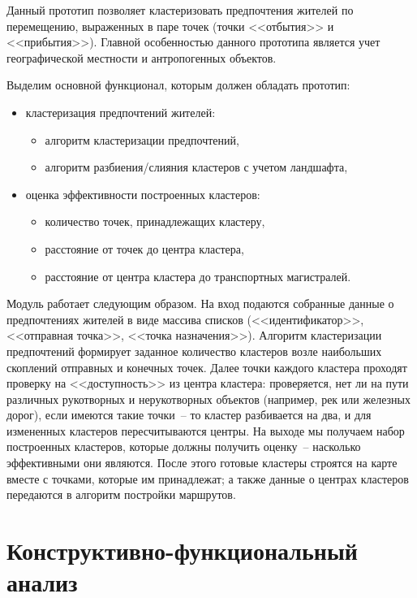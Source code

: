 Данный прототип позволяет кластеризовать предпочтения жителей по перемещению,
выраженных в паре точек (точки <<отбытия>> и <<прибытия>>). Главной
особенностью данного прототипа является учет географической местности и
антропогенных объектов.

Выделим основной функционал, которым должен обладать прототип:
\begin{itemize}
  \item кластеризация предпочтений жителей:
  \begin{itemize}
    \item алгоритм кластеризации предпочтений,
    \item алгоритм разбиения/слияния кластеров с учетом ландшафта,
  \end{itemize}
  \item оценка эффективности построенных кластеров:
  \begin{itemize}
    \item количество точек, принадлежащих кластеру,
    \item расстояние от точек до центра кластера,
    \item расстояние от центра кластера до транспортных магистралей.
  \end{itemize}
\end{itemize}

Модуль работает следующим образом. На вход подаются собранные данные о
предпочтениях жителей в виде массива списков (<<идентификатор>>,
<<отправная точка>>, <<точка назначения>>). Алгоритм кластеризации
предпочтений формирует заданное количество кластеров возле наибольших скоплений
отправных и конечных точек. Далее точки каждого кластера проходят проверку на
<<доступность>> из центра кластера: проверяется, нет ли на пути различных
рукотворных и нерукотворных объектов (например, рек или железных дорог), если
имеются такие точки~-- то кластер разбивается на два, и для измененных кластеров
пересчитываются центры. На выходе мы получаем набор построенных кластеров,
которые должны получить оценку~-- насколько эффективными они являются. После
этого готовые кластеры строятся на карте вместе с точками, которые им
принадлежат; а также данные о центрах кластеров передаются в алгоритм постройки
маршрутов.

\chapter{Конструктивно-функциональный анализ}

